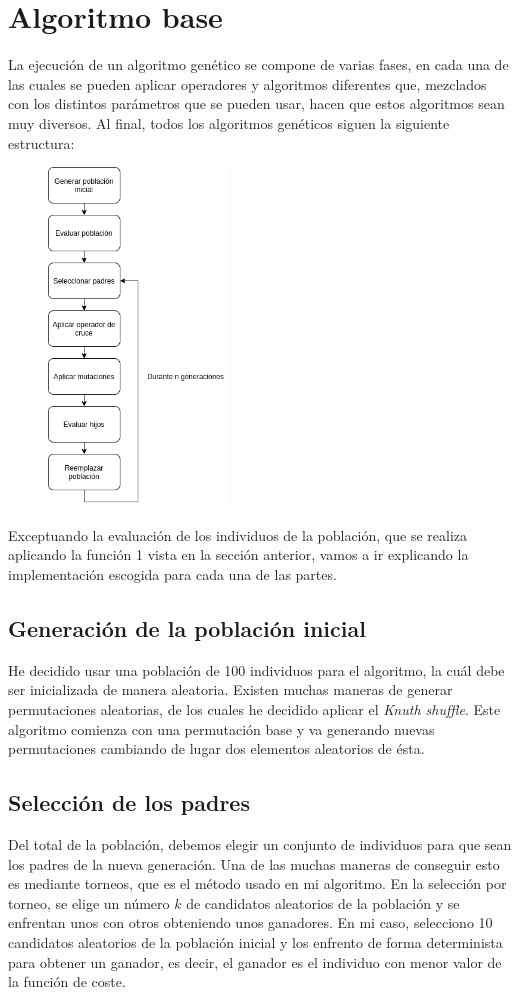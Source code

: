 \section{Algoritmo base}
La ejecución de un algoritmo genético se compone de varias fases, en cada una de las cuales se pueden aplicar operadores y algoritmos diferentes que, mezclados con los distintos parámetros que se pueden usar, hacen que estos algoritmos sean muy diversos. Al final, todos los algoritmos genéticos siguen la siguiente estructura:

\begin{figure}[H]
\centering
\includegraphics[height=9cm]{images/executionFlow.png}
\end{figure}

Exceptuando la evaluación de los individuos de la población, que se realiza aplicando la función 1 vista en la sección anterior, vamos a ir explicando la implementación escogida para cada una de las partes.

\subsection{Generación de la población inicial}
He decidido usar una población de 100 individuos para el algoritmo, la cuál debe ser inicializada de manera aleatoria. Existen muchas maneras de generar permutaciones aleatorias, de los cuales he decidido aplicar el \textit{Knuth shuffle}. Este algoritmo comienza con una permutación base y va generando nuevas permutaciones cambiando de lugar dos elementos aleatorios de ésta.

\subsection{Selección de los padres}
Del total de la población, debemos elegir un conjunto de individuos para que sean los padres de la nueva generación. Una de las muchas maneras de conseguir esto es mediante torneos, que es el método usado en mi algoritmo. En la selección por torneo, se elige un número $k$ de candidatos aleatorios de la población y se enfrentan unos con otros obteniendo unos ganadores. En mi caso, selecciono 10 candidatos aleatorios de la población inicial y los enfrento de forma determinista para obtener un ganador, es decir, el ganador es el individuo con menor valor de la función de coste.

